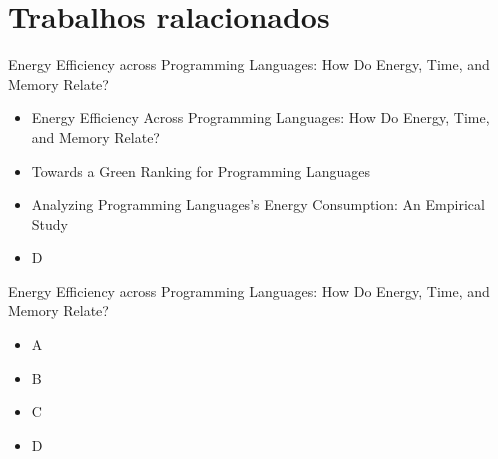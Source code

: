 \section{Trabalhos ralacionados}

\begin{frame}{Energy Efficiency across Programming Languages: How
    Do Energy, Time, and Memory Relate?}
    \begin{itemize}
        \item Energy Efficiency Across Programming Languages: How Do Energy, Time, and
        Memory Relate?
        \item Towards a Green Ranking for Programming Languages
        \item Analyzing Programming Languages’s Energy Consumption: An Empirical Study
        \item D 
    \end{itemize}
\end{frame}

\begin{frame}{Energy Efficiency across Programming Languages: How
    Do Energy, Time, and Memory Relate?}
    \begin{itemize}
        \item A
        \item B
        \item C 
        \item D 
    \end{itemize}
\end{frame}


